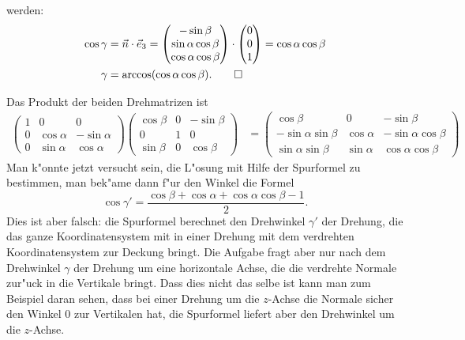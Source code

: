 \begin{loesung}
werden:
\begin{align*}
\cos\gamma
&=
\vec n\cdot\vec e_3=
\begin{pmatrix}
-\sin\beta\\
\sin\alpha\cos\beta\\
\cos\alpha\cos\beta
\end{pmatrix}
\cdot
\begin{pmatrix}0\\0\\1\end{pmatrix}=\cos\alpha\cos\beta
\\
\gamma&=\arccos(\cos\alpha\cos\beta).
\qedhere
\end{align*}
\end{loesung}

\begin{diskussion}
Das Produkt der beiden Drehmatrizen ist
\begin{align*}
\begin{pmatrix}
1&0&0\\
0&\cos\alpha&-\sin\alpha\\
0&\sin\alpha& \cos\alpha
\end{pmatrix}
\begin{pmatrix}
\cos\beta&0&-\sin\beta\\
0&1&0\\
\sin\beta&0&\cos\beta
\end{pmatrix}
&=
\begin{pmatrix}
\cos\beta           &0         &-\sin\beta\\
-\sin\alpha\sin\beta&\cos\alpha&-\sin\alpha\cos\beta\\
 \sin\alpha\sin\beta&\sin\alpha&\cos\alpha\cos\beta
\end{pmatrix}
\end{align*}
Man k"onnte jetzt versucht sein, die L"osung mit Hilfe der Spurformel
zu bestimmen, man bek"ame dann f"ur den Winkel die Formel
\[
\cos\gamma' = \frac{\cos\beta+\cos\alpha+\cos\alpha\cos\beta-1}{2}.
\]
Dies ist aber falsch: die Spurformel berechnet den Drehwinkel $\gamma'$
der Drehung,
die das ganze Koordinatensystem mit in einer Drehung mit dem verdrehten
Koordinatensystem zur Deckung bringt. Die Aufgabe fragt aber nur
nach dem Drehwinkel $\gamma$ der Drehung um eine horizontale Achse,
die die verdrehte Normale
zur"uck in die Vertikale bringt. Dass dies nicht das selbe ist kann
man zum Beispiel daran sehen, dass bei einer Drehung um die $z$-Achse 
die Normale sicher den Winkel 0 zur Vertikalen hat, die Spurformel
liefert aber den Drehwinkel um die $z$-Achse.
\end{diskussion}

